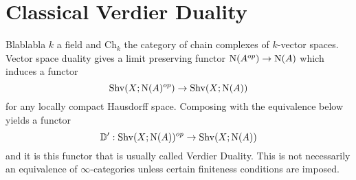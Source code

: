 \documentclass[../../thesis.tex]{subfiles}
\begin{document}
\section{Classical Verdier Duality}
Blablabla $k$ a field and $\mathrm{Ch}_k$ the category of chain complexes of $k$-vector spaces.
Vector space duality gives a limit preserving functor $\mathrm{N}(A^{op}) \to \mathrm{N}(A)$ which induces a functor
\[
    \mathrm{Shv}(X;\mathrm{N}(A)^{op}) \to \mathrm{Shv}(X;\mathrm{N}(A))
\]
for any locally compact Hausdorff space.
Composing with the equivalence below yields a functor
\[
    \mathbb{D}': \mathrm{Shv}(X;\mathrm{N}(A))^{op} \to \mathrm{Shv}(X;\mathrm{N}(A))
\]
and it is this functor that is usually called Verdier Duality. This is not necessarily an equivalence of $\infty$-categories unless certain finiteness conditions are imposed.
\end{document}
